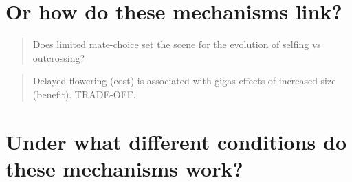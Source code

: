 \documentclass[openany, 12pt, draft]{book}
\begin{document}
\section{Or how do these mechanisms
link?}\label{or-how-do-these-mechanisms-link}

\begin{quote}
Does limited mate-choice set the scene for the evolution of selfing vs
outcrossing?
\end{quote}

\begin{quote}
Delayed flowering (cost) is associated with gigas-effects of increased
size (benefit). TRADE-OFF.
\end{quote}

\section{Under what different conditions do these mechanisms
work?}\label{under-what-different-conditions-do-these-mechanisms-work}


\end{document}
